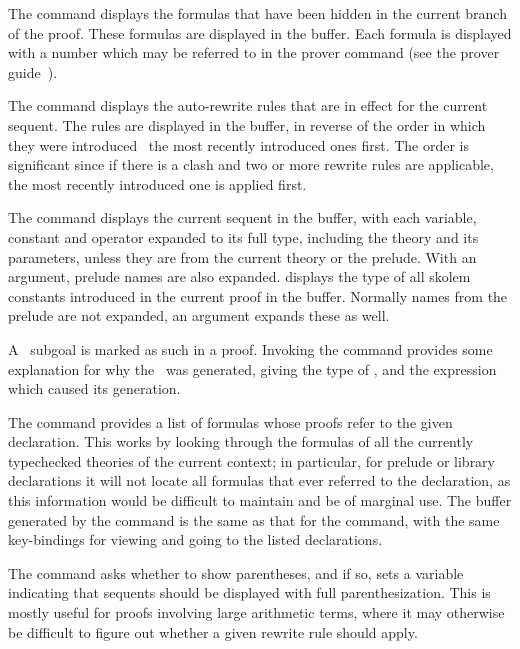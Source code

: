 The  command displays the formulas that have
been hidden in the current branch of the proof.  These formulas are
displayed in the  buffer.  Each formula is displayed with a
number which may be referred to in the  prover command (see
the prover guide~\cite{PVS:prover}).

The  command displays the auto-rewrite rules that
are in effect for the current sequent.  The rules are displayed in the
 buffer, in reverse of the order in which they were
introduced \ie\ the most recently introduced ones first.  The order is
significant since if there is a clash and two or more rewrite rules are
applicable, the most recently introduced one is applied first.

The  command displays the current sequent in
the  buffer, with each variable, constant and
operator expanded to its full type, including the theory and its
parameters, unless they are from the current theory or the prelude.  With
an argument, prelude names are also expanded. 
displays the type of all skolem constants introduced in the current proof
in the  buffer.  Normally names from the prelude are
not expanded, an argument expands these as well.

A \tcc\ subgoal is marked as such in a proof. Invoking the
 command provides some explanation for why the \tcc\ was
generated, giving the type of \tcc, and the expression which caused its
generation.

The  command provides a list of formulas whose proofs
refer to the given declaration.  This works by looking through the
formulas of all the currently typechecked theories of the current context;
in particular, for prelude or library declarations it will not locate all
formulas that ever referred to the declaration, as this information would
be difficult to maintain and be of marginal use.  The buffer generated by
the  command is the same as that for the
 command, with the same key-bindings for viewing and
going to the listed declarations.

The  command asks whether to show parentheses,
and if so, sets a variable indicating that sequents should be displayed
with full parenthesization.  This is mostly useful for proofs involving
large arithmetic terms, where it may otherwise be difficult to figure out
whether a given rewrite rule should apply.

